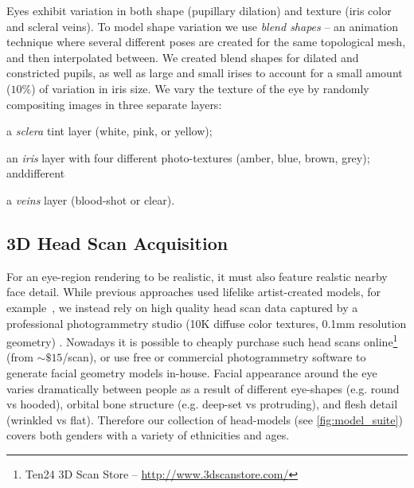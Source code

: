 Eyes exhibit variation in both shape (pupillary dilation) and texture (iris color and scleral veins).
To model shape variation we use \emph{blend shapes} -- an animation technique where several different poses are created for the same topological mesh, and then interpolated between\cite{orvalho2012facial}. 
We created blend shapes for dilated and constricted pupils, as well as large and small irises to account for a small amount ($10\%$) of variation in iris size.
We vary the texture of the eye by randomly compositing images in three separate layers:
\begin{inparaenum}
\item a \emph{sclera} tint layer (white, pink, or yellow);
\item an \emph{iris} layer with four different photo-textures (amber, blue, brown, grey); anddifferent
\item a \emph{veins} layer (blood-shot or clear).
\end{inparaenum}

\subsection{3D Head Scan Acquisition}
\label{sec:eye_region_geom_prep}

For an eye-region rendering to be realistic, it must also feature realstic nearby face detail.
While previous approaches used lifelike artist-created models, for example~\cite{swirski2014rendering}, we instead rely on high quality head scan data captured by a professional photogrammetry studio (10K diffuse color textures, 0.1mm resolution geometry) \cite{Ten24}.
Nowadays it is possible to cheaply purchase such head scans online\footnote{Ten24 3D Scan Store -- \url{http://www.3dscanstore.com/}} (from $\sim\!\$15$/scan), or use free or commercial photogrammetry software to generate facial geometry models in-house.
Facial appearance around the eye varies dramatically between people as a result of different eye-shapes (e.g. round vs hooded), orbital bone structure (e.g. deep-set vs protruding), and flesh detail (wrinkled vs flat). Therefore our collection of head-models (see \autoref{fig:model_suite}) covers both genders with a variety of ethnicities and ages.

